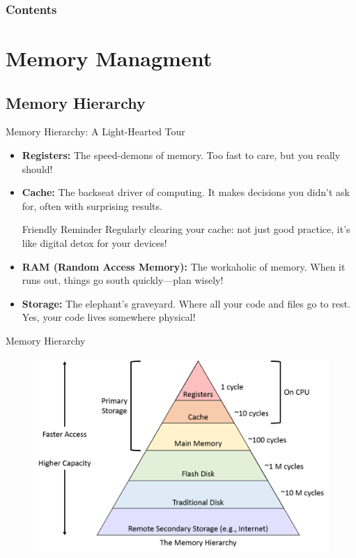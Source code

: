 \documentclass[10pt]{beamer}
\title[Universidad Panamericana]{}
\subtitle{FreeRTOS Architecture Part 1}
\author[]{Name}
\institute[ltonix@up.edu.mx]{Universidad Panamericana}
\date[Presentation \today]{Presentation \today}
\begin{document}
\frame{\titlepage}
\begin{frame}
\frametitle{Contents}
\tableofcontents
\end{frame}

\section{Memory Managment}

\subsection{Memory Hierarchy}
\begin{frame}{Memory Hierarchy: A Light-Hearted Tour}
  \begin{itemize}
    \item \textbf{Registers:} The speed-demons of memory. Too fast to care, but you really should!
    \item \textbf{Cache:} The backseat driver of computing. It makes decisions you didn't ask for, often with surprising results.
    \begin{alertblock}{Friendly Reminder}
      Regularly clearing your cache: not just good practice, it's like digital detox for your devices!
    \end{alertblock}
    \item \textbf{RAM (Random Access Memory):} The workaholic of memory. When it runs out, things go south quickly—plan wisely!
    \item \textbf{Storage:} The elephant's graveyard. Where all your code and files go to rest. Yes, your code lives somewhere physical!
  \end{itemize}
\end{frame}

\begin{frame}{Memory Hierarchy}
  \begin{figure}[h]
    \centering
    \includegraphics[width=1.0\textwidth]{figures/MemoryHerarchy.png}
    \label{fig:MemoryHerarchy}
  \end{figure}
\end{frame}
\end{document}
